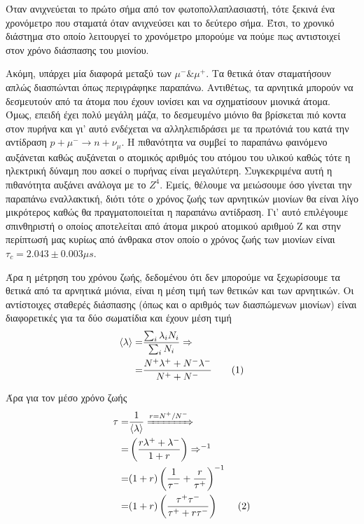 \documentclass[a4paper]{book}
\newcommand\numberthis{\addtocounter{equation}{1}\tag{\theequation}}
\begin{document}
	Όταν ανιχνεύεται το πρώτο σήμα από τον φωτοπολλαπλασιαστή, τότε ξεκινά ένα χρονόμετρο που σταματά όταν ανιχνεύσει και το δεύτερο σήμα. Έτσι, το χρονικό διάστημα στο οποίο λειτουργεί το χρονόμετρο μπορούμε να πούμε πως αντιστοιχεί στον χρόνο διάσπασης του μιονίου.
	
	Ακόμη, υπάρχει μία διαφορά μεταξύ των $\mu^- \& \mu^+$. Τα θετικά όταν σταματήσουν απλώς διασπώνται όπως περιγράφηκε παραπάνω.
	Αντιθέτως, τα αρνητικά μπορούν να δεσμευτούν από τα άτομα που έχουν ιονίσει και να σχηματίσουν μιονικά άτομα. Όμως, επειδή έχει πολύ μεγάλη μάζα, το δεσμευμένο μιόνιο θα βρίσκεται πιό κοντα στον πυρήνα και γι' αυτό ενδέχεται να αλληλεπιδράσει με τα πρωτόνιά του κατά την αντίδραση $p+ \mu^-\rightarrow n+\nu_\mu$.
	Η πιθανότητα να συμβεί το παραπάνω φαινόμενο αυξάνεται καθώς αυξάνεται ο ατομικός αριθμός του ατόμου του υλικού καθώς τότε η ηλεκτρική δύναμη που ασκεί ο πυρήνας είναι μεγαλύτερη. Συγκεκριμένα αυτή η πιθανότητα αυξάνει ανάλογα με το $Z^4$. 	
	Εμείς, θέλουμε να μειώσουμε όσο γίνεται την παραπάνω εναλλακτική, διότι τότε ο χρόνος ζωής των αρνητικών μιονίων θα είναι λίγο μικρότερος καθώς θα πραγματοποιείται η παραπάνω αντίδραση. 
	Γι' αυτό επιλέγουμε σπινθηριστή ο οποίος αποτελείται από άτομα μικρού ατομικού αριθμού Z και στην περίπτωσή μας κυρίως από άνθρακα στον οποίο ο χρόνος ζωής των μιονίων είναι $\tau_c = 2.043\pm0.003 \mu s$.
	
	Άρα η μέτρηση του χρόνου ζωής, δεδομένου ότι δεν μπορούμε να ξεχωρίσουμε τα θετικά από τα αρνητικά μιόνια, είναι η μέση τιμή των θετικών και των αρνητικών.
	Οι αντίστοιχες σταθερές διάσπασης (όπως και ο αριθμός των διασπώμενων μιονίων) είναι διαφορετικές για τα δύο σωματίδια και έχουν μέση τιμή 
	\begin{align*}\label{eq7}
		\braket{\lambda} =& \frac{\sum_i \lambda_iN_i}{\sum_i N_i} \Rightarrow\\
		                =& \frac{N^+\lambda^+ + N^- \lambda^-}{N^+ + N^-} \numberthis
	\end{align*}
	
	Άρα για τον μέσο χρόνο ζωής 
		\begin{align*}\label{eq8}
			\tau =& \frac{1}{\braket{\lambda}} \xRightarrow{r = N^+/N^-}\\
			     =& \left( \frac{r \lambda^+ + \lambda^-}{1+r}\right)\Rightarrow^{-1}\\
			     =& (1+r) \left(\frac{1}{\tau^-}+ \frac{r}{\tau^+}\right)^{-1} \\
			     =& (1+r) \left(\frac{\tau^+\tau^-}{\tau^++r\tau^-}\right)\numberthis
		\end{align*}
		
\end{document}
